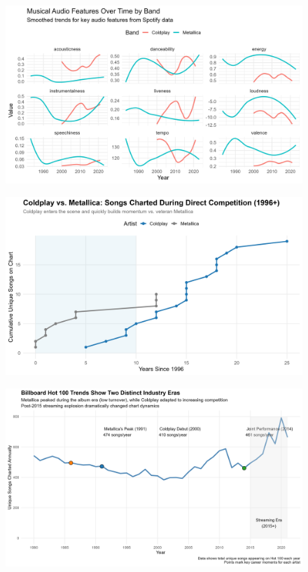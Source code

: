 \documentclass[
  man,floatsintext]{apa6}
\begin{document}
\begin{figure}

{\centering \includegraphics[width=0.9\linewidth]{../Question2/Results/extraeffects} 

}

\caption{ }\label{fig:include-image-4}
\end{figure}
\begin{figure}

{\centering \includegraphics[width=0.9\linewidth]{../Question2/Results/directcompetition} 

}

\caption{ }\label{fig:include-image-5}
\end{figure}
\begin{figure}

{\centering \includegraphics[width=0.9\linewidth]{../Question2/Results/industrytrend} 

}

\caption{ }\label{fig:include-image-6}
\end{figure}
\end{document}
